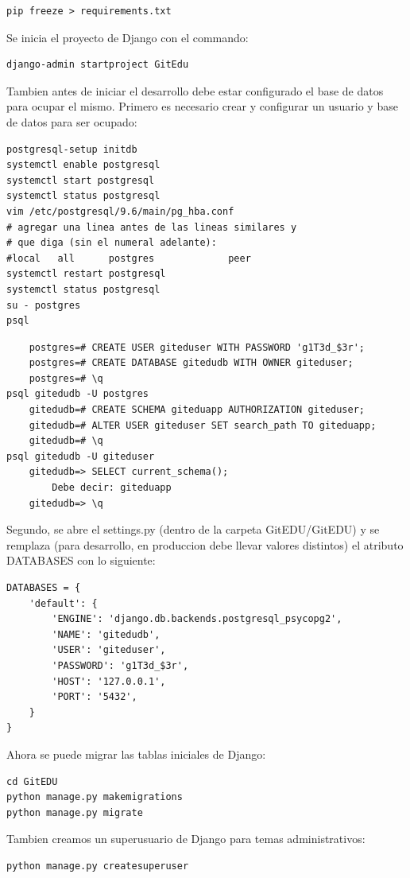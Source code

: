 \begin{lstlisting}
pip freeze > requirements.txt
\end{lstlisting}

Se inicia el proyecto de Django con el commando:

\begin{lstlisting}
django-admin startproject GitEdu
\end{lstlisting}

Tambien antes de iniciar el desarrollo debe estar configurado el base de datos para ocupar el mismo. Primero es necesario crear y configurar un usuario y base de datos para ser ocupado:
\begin{lstlisting}
postgresql-setup initdb
systemctl enable postgresql
systemctl start postgresql
systemctl status postgresql
vim /etc/postgresql/9.6/main/pg_hba.conf
# agregar una linea antes de las lineas similares y
# que diga (sin el numeral adelante):
#local   all      postgres             peer
systemctl restart postgresql
systemctl status postgresql
su - postgres
psql
\end{lstlisting}
\begin{lstlisting}
	postgres=# CREATE USER giteduser WITH PASSWORD 'g1T3d_$3r';
	postgres=# CREATE DATABASE gitedudb WITH OWNER giteduser;
	postgres=# \q
psql gitedudb -U postgres
	gitedudb=# CREATE SCHEMA giteduapp AUTHORIZATION giteduser;
	gitedudb=# ALTER USER giteduser SET search_path TO giteduapp;
	gitedudb=# \q
psql gitedudb -U giteduser
	gitedudb=> SELECT current_schema();
		Debe decir: giteduapp
	gitedudb=> \q
\end{lstlisting}

Segundo, se abre el settings.py (dentro de la carpeta GitEDU/GitEDU) y se remplaza (para desarrollo, en produccion debe llevar valores distintos) el atributo DATABASES con lo siguiente:
\lstset{language=Python}
\begin{lstlisting}
DATABASES = {
    'default': {
        'ENGINE': 'django.db.backends.postgresql_psycopg2',
        'NAME': 'gitedudb',
        'USER': 'giteduser',
        'PASSWORD': 'g1T3d_$3r',
        'HOST': '127.0.0.1',
        'PORT': '5432',
    }
}
\end{lstlisting}
\lstset{language=Bash}

Ahora se puede migrar las tablas iniciales de Django:
\begin{lstlisting}
cd GitEDU
python manage.py makemigrations
python manage.py migrate
\end{lstlisting}

Tambien creamos un superusuario de Django para temas administrativos:
\begin{lstlisting}
python manage.py createsuperuser
\end{lstlisting}

